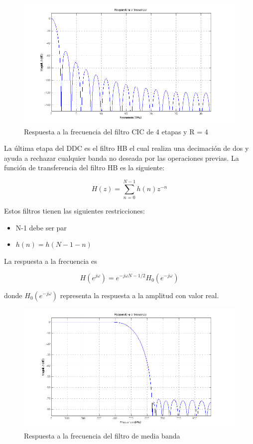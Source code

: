 \begin{figure}[tp]
\centering
	\includegraphics[width=5.9in]{figs/cicresponse}
	\caption{Respuesta a la frecuencia del filtro CIC de 4 etapas y R =	4}
	\label{fig:cicresp}
\end{figure}

La \'ultima etapa del DDC es el filtro HB el cual realiza una decimaci\'on de dos
y ayuda a rechazar cualquier banda no deseada por las operaciones previas. La
funci\'on de transferencia del filtro HB \cite{nguyen} es la
siguiente:

\begin{equation}
H(z)=\sum_{n=0}^{N-1}h(n)z^{-n}
\end{equation}

Estos filtros tienen las siguientes restricciones:

\begin{itemize}
  \item N-1 debe ser par
  \item $h(n)=h(N-1-n)$
\end{itemize}

La respuesta a la frecuencia es

\begin{equation}
H(e^{j\omega})=e^{-j\omega N-1/2}H_0(e^{-j\omega})
\end{equation}

donde $H_0(e^{-j\omega})$ representa la respuesta a la amplitud con valor real.

\begin{figure}[pt]
\centering
	\includegraphics[width=5.9in]{figs/hbresponse}
	\caption{Respuesta a la frecuencia del filtro de media banda}
	\label{fig:hbresp}
\end{figure}

